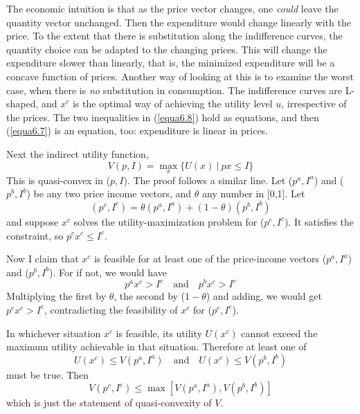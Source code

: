 The economic intuition is that as the price vector changes, one \textit{could} leave the quantity vector unchanged. Then the expenditure would change linearly with the price. To the extent that there is substitution along the indifference curves, the quantity choice can be adapted to the changing prices. This will change the expenditure slower than linearly, that is, the minimized expenditure will be a concave function of prices. Another way of looking at this is to examine the worst case, when there is \textit{no} substitution in consumption. The indifference curves are L-shaped, and $x^c$ is the optimal way of achieving the utility level $u$, irrespective of the prices. The two inequalities in (\ref{equa6.8}) hold as equations, and then (\ref{equa6.7}) is an equation, too: expenditure is linear in prices.

Next the indirect utility function,
\begin{equation} \label{equa6.9}
V(p,I) = \max\limits_x \{ U(x) \ | \ px \leq I \}
\end{equation}
This is quasi-convex in ($p,I$). The proof follows a similar line. Let ($p^a, I^a$) and ($p^b, I^b$) be any two price income vectors, and $\theta$ any number in [0,1]. Let
\begin{equation*}  
 (p^c, I^c) = \theta(p^a, I^a) + (1-\theta)(p^b, I^b)
\end{equation*}
and suppose $x^c$ solves the utility-maximization problem for ($p^c, I^c$). It satisfies the constraint, so $p^c x^c \leq I^c$.

Now I claim that $x^c$ is feasible for at least one of the price-income vectors ($p^a, I^a$) and ($p^b, I^b$). For if not, we would have
\begin{equation*}  
 p^a x^c > I^c \quad \mbox{and} \quad p^b x^c > I^c
\end{equation*}
Multiplying the first by $\theta$, the second by ($1-\theta$) and adding, we would get $p^c x^c > I^c$, contradicting the feasibility of $x^c$ for ($p^c, I^c$).

In whichever situation $x^c$ is feasible, its utility $U(x^c)$ cannot exceed the maximum utility achievable in that situation. Therefore at least one of 
\begin{equation*}  
 U(x^c) \leq V(p^a ,I^a) \quad \mbox{and} \quad U(x^c) \leq V(p^b ,I^b)
\end{equation*}
must be true. Then
\begin{equation*}  
 V(p^c ,  I^c) \leq \max [ V(p^a, I^a), V(p^b, I^b)  ]
\end{equation*}
which is just the statement of quasi-convexity of $V$.


